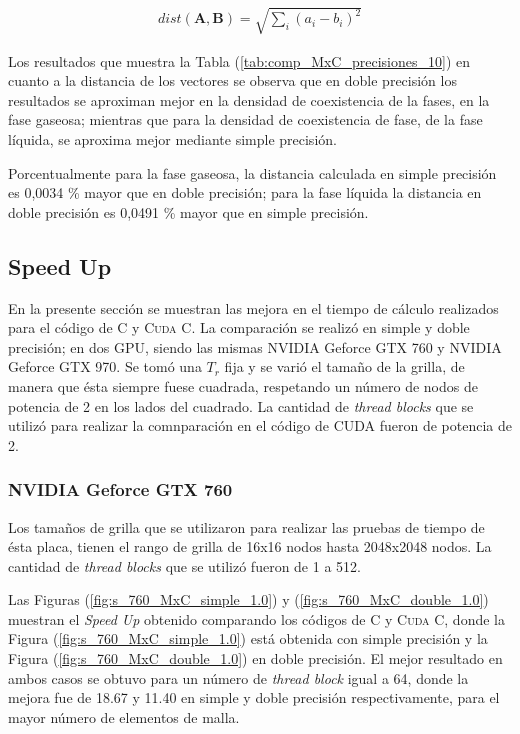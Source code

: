 \begin{align}
dist(\mathbf{A},\mathbf{B}) = \sqrt{\sum_i {\left( a_i - b_i \right)}^2  }
\label{eq:norma_euclidea}
\end{align}

Los resultados que muestra la Tabla (\ref{tab:comp_MxC_precisiones_10}) en cuanto a la distancia de los vectores se observa que en doble precisión los resultados se aproximan mejor en la densidad de coexistencia de la fases, en la fase gaseosa; mientras que para la densidad de coexistencia de fase, de la fase líquida, se aproxima mejor mediante simple precisión. 

Porcentualmente para la fase gaseosa, la distancia calculada en simple precisión es 0,0034 \% mayor que en doble precisión; para la fase líquida la distancia en doble precisión es 0,0491 \% mayor que en simple precisión.




\newpage

\subsection{Speed Up}

En la presente sección se muestran las mejora en el tiempo de cálculo realizados para el código de \textsc{C} y \textsc{Cuda C}. La comparación se realizó en simple y doble precisión; en dos GPU, siendo las mismas NVIDIA Geforce GTX 760 y NVIDIA Geforce GTX 970. Se tomó una $T_r$ fija y se varió el tamaño de la grilla, de manera que ésta siempre fuese cuadrada, respetando un número de nodos de potencia de 2 en los lados del cuadrado. La cantidad de \textit{thread blocks} que se utilizó para realizar la comnparación en el código de \textsc{CUDA} fueron de potencia de 2.

\subsubsection{NVIDIA Geforce GTX 760}

Los tamaños de grilla que se utilizaron para realizar las pruebas de tiempo de ésta placa, tienen el rango de grilla de 16x16 nodos hasta 2048x2048 nodos. La cantidad de \textit{thread blocks} que se utilizó fueron de 1 a 512.

Las Figuras (\ref{fig:s_760_MxC_simple_1.0}) y (\ref{fig:s_760_MxC_double_1.0}) muestran el \textit{Speed Up} obtenido comparando los códigos de \textsc{C} y \textsc{Cuda C}, donde la Figura (\ref{fig:s_760_MxC_simple_1.0}) está obtenida con simple precisión y la Figura (\ref{fig:s_760_MxC_double_1.0}) en doble precisión. El mejor resultado en ambos casos se obtuvo para un número de \textit{thread block} igual a 64, donde la mejora fue de 18.67 y 11.40 en simple y doble precisión respectivamente, para el mayor número de elementos de malla.


